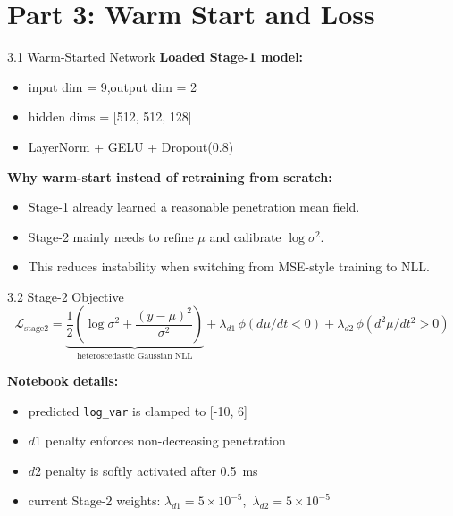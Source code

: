 \documentclass[UTF8,aspectratio=169]{ctexbeamer}
\begin{document}
\section{Part 3: Warm Start and Loss}

\begin{frame}{3.1 Warm-Started Network}
\textbf{Loaded Stage-1 model:}
\begin{itemize}
  \item input dim = 9,\quad output dim = 2
  \item hidden dims = [512, 512, 128]
  \item LayerNorm + GELU + Dropout(0.8)
\end{itemize}

\vspace{0.3em}
\textbf{Why warm-start instead of retraining from scratch:}
\begin{itemize}
  \item Stage-1 already learned a reasonable penetration mean field.
  \item Stage-2 mainly needs to refine $\mu$ and calibrate $\log \sigma^2$.
  \item This reduces instability when switching from MSE-style training to NLL.
\end{itemize}
\end{frame}

\begin{frame}{3.2 Stage-2 Objective}
\[
\mathcal{L}_{\mathrm{stage2}} =
\underbrace{\frac{1}{2}
\left(
\log \sigma^2 + \frac{(y-\mu)^2}{\sigma^2}
\right)}_{\text{heteroscedastic Gaussian NLL}}
 + \lambda_{d1}\,\phi(d\mu/dt<0)
 + \lambda_{d2}\,\phi(d^2\mu/dt^2>0)
\]

\vspace{0.3em}
\textbf{Notebook details:}
\begin{itemize}
  \item predicted \texttt{log\_var} is clamped to [-10, 6]
  \item $d1$ penalty enforces non-decreasing penetration
  \item $d2$ penalty is softly activated after \SI{0.5}{ms}
  \item current Stage-2 weights: $\lambda_{d1}=5\times 10^{-5}$,\ $\lambda_{d2}=5\times 10^{-5}$
\end{itemize}
\end{frame}
\end{document}
